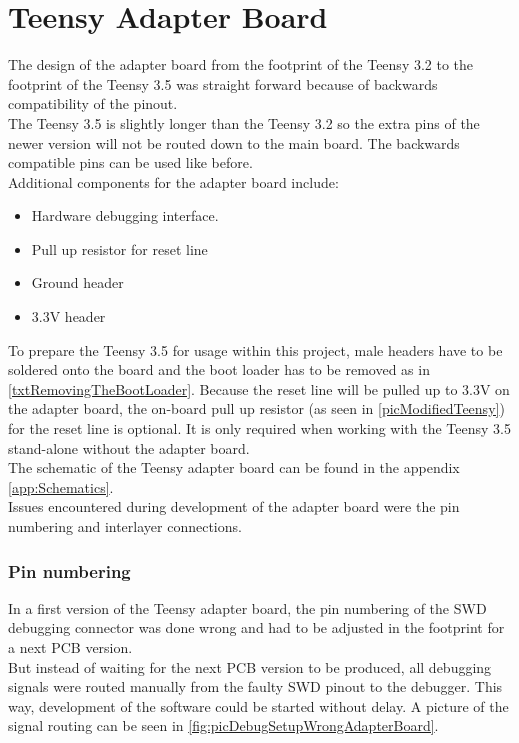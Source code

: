 \section{Teensy Adapter Board} \label{sec:txtTeensyAdapterBoard}
The design of the adapter board from the footprint of the Teensy 3.2 to the footprint of the Teensy 3.5 was straight forward because of backwards compatibility of the pinout.\\
The Teensy 3.5 is slightly longer than the Teensy 3.2 so the extra pins of the newer version will not be routed down to the main board. The backwards compatible pins can be used like before.\\
Additional components for the adapter board include:
\begin{itemize}
    \item Hardware debugging interface.
    \item Pull up resistor for reset line
    \item Ground header
    \item 3.3V header
\end{itemize}
To prepare the Teensy 3.5 for usage within this project, male headers have to be soldered onto the board and the boot loader has to be removed as in \ref{txtRemovingTheBootLoader}. Because the reset line will be pulled up to 3.3V on the adapter board, the on-board pull up resistor (as seen in \autoref{picModifiedTeensy}) for the reset line is optional. It is only required when working with the Teensy 3.5 stand-alone without the adapter board.\\
The schematic of the Teensy adapter board can be found in the appendix \autoref{app:Schematics}.\\
Issues encountered during development of the adapter board were the pin numbering and interlayer connections.
\subsubsection{Pin numbering}
In a first version of the Teensy adapter board, the pin numbering of the SWD debugging connector was done wrong and had to be adjusted in the footprint for a next PCB version.\\
But instead of waiting for the next PCB version to be produced, all debugging signals were routed manually from the faulty SWD pinout to the debugger. This way, development of the software could be started without delay. A picture of the signal routing can be seen in \autoref{fig:picDebugSetupWrongAdapterBoard}.
